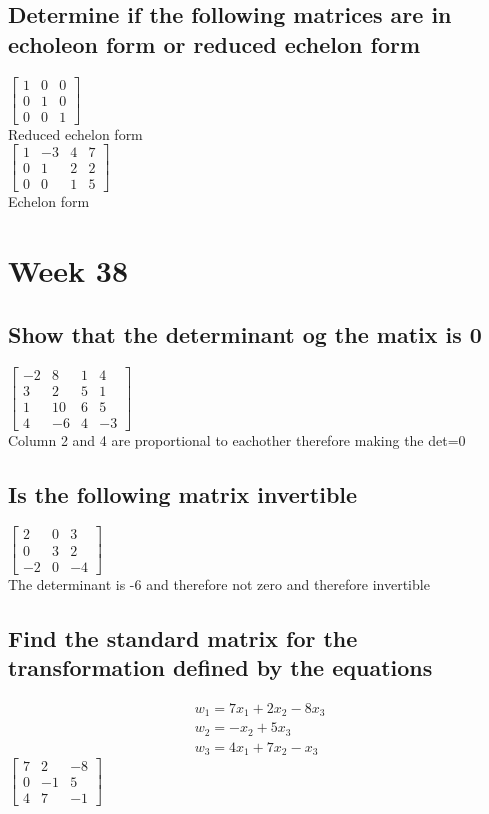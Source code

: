 \documentclass[12pt, a4paper]{article}
\begin{document}
		\subsection{Determine if the following matrices are in echoleon form or reduced echelon form}
			$\begin{bmatrix}
				1 & 0 & 0 \\
				0 & 1 & 0\\
				0 & 0 & 1 
			\end{bmatrix}$\\
			Reduced echelon form\\
			$\begin{bmatrix}
				1 & -3 & 4 & 7 \\
				0 & 1 & 2 & 2\\
				0 & 0 & 1  & 5
			\end{bmatrix}$\\
			Echelon form
	\section{Week 38}
		\subsection{Show that the determinant og the matix is 0}
			$\begin{bmatrix}
				-2 & 8 & 1 & 4 \\
				3 & 2 & 5 & 1\\
				1 & 10 & 6  & 5\\
				4 & -6 & 4  & -3
			\end{bmatrix}$\\[3mm]
			Column 2 and 4 are proportional to eachother therefore making the det=0
		\subsection{Is the following matrix invertible}
			$\begin{bmatrix}
				2 & 0 & 3 \\
				0 & 3 & 2 \\
				-2 & 0 & -4
			\end{bmatrix}$\\[3mm]
			The determinant is -6 and therefore not zero and therefore invertible
		\subsection{Find the standard matrix for the transformation defined by the equations}
			\begin{align*}
				w_1=7x_1+2x_2-8x_3\\
				w_2=-x_2+5x_3\\
				w_3=4x_1+7x_2-x_3
			\end{align*}
			$\begin{bmatrix}
				7 & 2 & -8 \\
				0 & -1 & 5 \\
				4 & 7 & -1
			\end{bmatrix}$\\[3mm]
\end{document}

